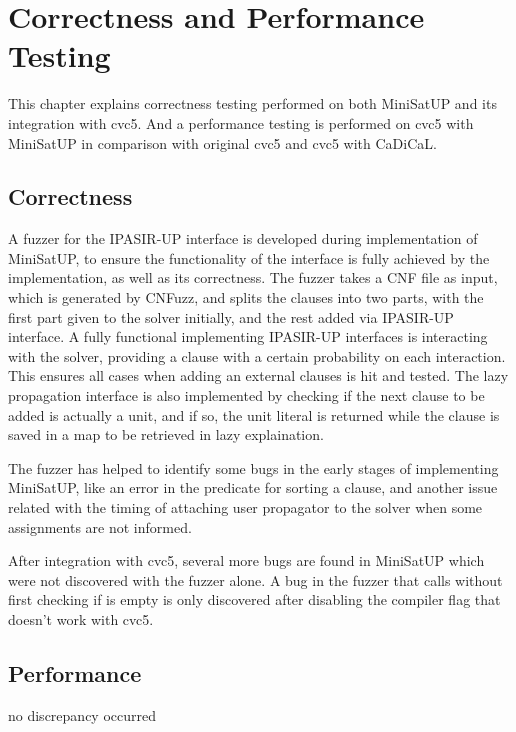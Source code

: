 \chapter{Correctness and Performance Testing}

This chapter explains correctness testing performed on both MiniSatUP and its integration with cvc5. And a performance testing is performed on cvc5 with MiniSatUP in comparison with original cvc5 and cvc5 with CaDiCaL.

\section{Correctness}


A fuzzer for the IPASIR-UP interface is developed during implementation of MiniSatUP, to ensure the functionality of the interface is fully achieved by the implementation, as well as its correctness. The fuzzer takes a CNF file as input, which is generated by CNFuzz, and splits the clauses into two parts, with the first part given to the solver initially, and the rest added via IPASIR-UP interface. A fully functional  implementing IPASIR-UP interfaces is interacting with the solver, providing a clause with a certain probability on each interaction. This ensures all cases when adding an external clauses is hit and tested. The lazy propagation interface is also implemented by checking if the next clause to be added is actually a unit, and if so, the unit literal is returned while the clause is saved in a map to be retrieved in lazy explaination.


The fuzzer has helped to identify some bugs in the early stages of implementing MiniSatUP, like an error in the predicate for sorting a clause, and another issue related with the timing of attaching user propagator to the solver when some assignments are not informed.


After integration with cvc5, several more bugs are found in MiniSatUP which were not discovered with the fuzzer alone. A bug in the fuzzer that calls  without first checking if  is empty is only discovered after disabling the compiler flag  that doesn't work with cvc5.


\section{Performance}


no discrepancy occurred


